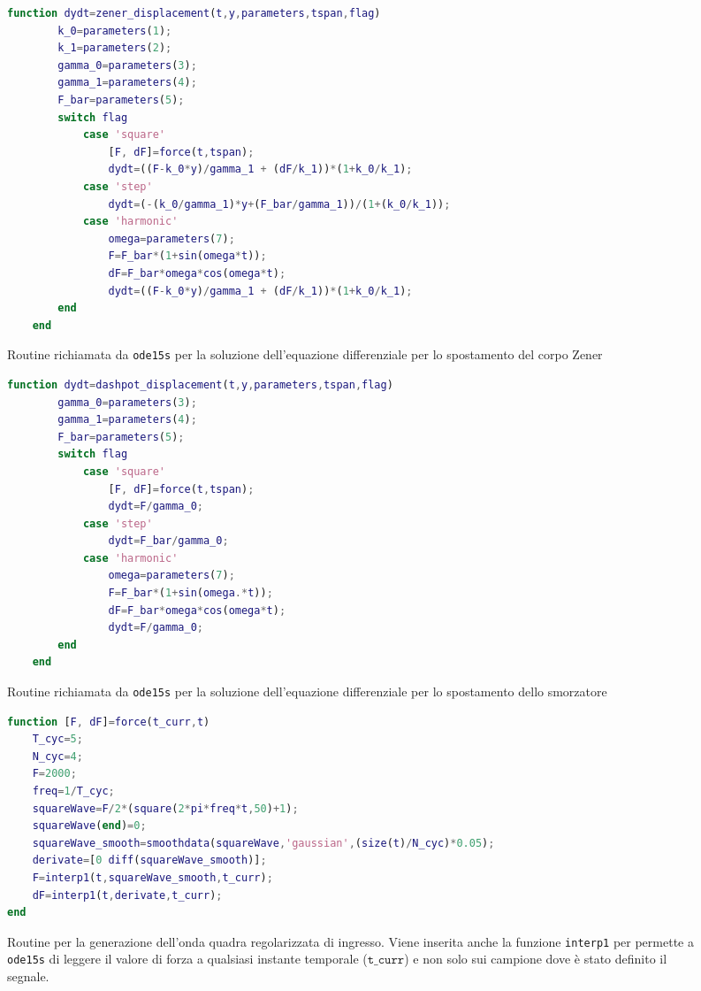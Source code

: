 \begin{figure}[t!]
\begin{lstlisting}[language=matlab]
	function dydt=zener_displacement(t,y,parameters,tspan,flag)
		k_0=parameters(1);
		k_1=parameters(2);
		gamma_0=parameters(3);
		gamma_1=parameters(4);
		F_bar=parameters(5);
		switch flag
			case 'square'
				[F, dF]=force(t,tspan);
				dydt=((F-k_0*y)/gamma_1 + (dF/k_1))*(1+k_0/k_1);
			case 'step'
				dydt=(-(k_0/gamma_1)*y+(F_bar/gamma_1))/(1+(k_0/k_1));
			case 'harmonic'
				omega=parameters(7);
				F=F_bar*(1+sin(omega*t));
				dF=F_bar*omega*cos(omega*t);
				dydt=((F-k_0*y)/gamma_1 + (dF/k_1))*(1+k_0/k_1);
		end
	end
\end{lstlisting}
\caption{Routine richiamata da \texttt{ode15s} per la soluzione dell'equazione differenziale per lo spostamento del corpo Zener}
\vspace{0.8cm}
\begin{lstlisting}[language=matlab]
	function dydt=dashpot_displacement(t,y,parameters,tspan,flag)
		gamma_0=parameters(3);
		gamma_1=parameters(4);
		F_bar=parameters(5);
		switch flag
			case 'square'
				[F, dF]=force(t,tspan);
				dydt=F/gamma_0;
			case 'step'
				dydt=F_bar/gamma_0;
			case 'harmonic'
				omega=parameters(7);
				F=F_bar*(1+sin(omega.*t));
				dF=F_bar*omega*cos(omega*t);
				dydt=F/gamma_0;
		end
	end	
\end{lstlisting}
\caption{Routine richiamata da \texttt{ode15s} per la soluzione dell'equazione differenziale per lo spostamento dello smorzatore}
\end{figure}


\begin{figure}[t!]
	\begin{lstlisting}[language=matlab]
function [F, dF]=force(t_curr,t)	
	T_cyc=5;
	N_cyc=4;
	F=2000;
	freq=1/T_cyc;
	squareWave=F/2*(square(2*pi*freq*t,50)+1);
	squareWave(end)=0;
	squareWave_smooth=smoothdata(squareWave,'gaussian',(size(t)/N_cyc)*0.05);
	derivate=[0 diff(squareWave_smooth)];
	F=interp1(t,squareWave_smooth,t_curr);
	dF=interp1(t,derivate,t_curr);
end
	\end{lstlisting}
	\caption{Routine per la generazione dell'onda quadra regolarizzata di ingresso. Viene inserita anche la funzione \texttt{interp1} per permette a \texttt{ode15s} di leggere il valore di forza a qualsiasi instante temporale ($\mathtt{t\_curr}$) e non solo sui campione dove è stato definito il segnale.}
\end{figure}

